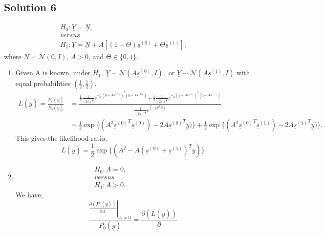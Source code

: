 \documentclass[a4paper,english,12pt]{article}
\newcommand{\ubar}[1]{\underline{#1}}
\begin{document}
\hypertarget{solution6}{\subsection*{Solution 6}}
\begin{gather*}
H_0: \ubar{Y}=\ubar{N},\\
versus\hspace{200pt}\\
H_1: \ubar{Y}=\ubar{N}+A\left[(1-\Theta)\ubar{s}^{(0)}+\Theta\ubar{s}^{(1)}\right],
\end{gather*}
where 
$\underline{N}=\mathcal{N}(\underline{0},I)$, $A>0$, and $\Theta\in\{0,1\}$.
\begin{enumerate}[label=(\alph*).]
\item Given A is known, under $H_1,~\underline{Y}\sim\mathcal{N}(A\underline{s}^{(0)},I),$ or $\underline{Y}\sim\mathcal{N}(A\underline{s}^{(1)},I)$ with equal probabilities $(\frac{1}{2},\frac{1}{2})$.
\begin{align*}
L(\underline{y})=\frac{P_1\left(\underline{y}\right)}{P_0\left(\underline{y}\right)}&=\frac{\frac{1}{2}\frac{1}{(2\pi)^{\frac{n}{2}}}e^{-\frac{1}{2}\left(\underline{y}-A \underline{s}^{(0)} \right)^T \left(\underline{y}-A \underline{s}^{(0)} \right)} +\frac{1}{2}\frac{1}{(2\pi)^{\frac{n}{2}}}e^{-\frac{1}{2}\left(\underline{y}-A \underline{s}^{(1)} \right)^T \left(\underline{y}-A \underline{s}^{(1)} \right)} }{\frac{1}{(2\pi)^{\frac{n}{2}}} e^{(-\frac{1}{2}\underline{y}^T \,\underline{y})}}\\
&=\frac{1}{2}\exp\{(A^2 {\underline{s}^{(0)}}^T \underline{s}^{(0)})- 2 A {\underline{s}^{(0)}}^T \underline{y})\} + \frac{1}{2}\exp\{(A^2 {\underline{s}^{(0)}}^T \underline{s}^{(1)})- 2 A {\underline{s}^{(1)}}^T \underline{y})\}.
\end{align*}
This gives the likelihood ratio,
\begin{equation*}
L(\underline{y})=\frac{1}{2} \exp\{\left({A^2}- A (\underline{s}^{(0)}+\underline{s}^{(1)})^T \underline{y}\right)\}
\end{equation*}
\item \begin{gather*}
H_0: A=0,\\
versus\hspace{100pt}\\
H_1: A>0.
\end{gather*}
We have,
\begin{equation*}
\frac{\left.\frac{\partial(P_1(\underline{y}))}{\partial A}\right|_{A=0}}{P_0(\underline{y})}=\left. \frac{\partial(L(\underline{y}))}{\partial
}
\end{equation*}
\end{enumerate}
\end{document}
